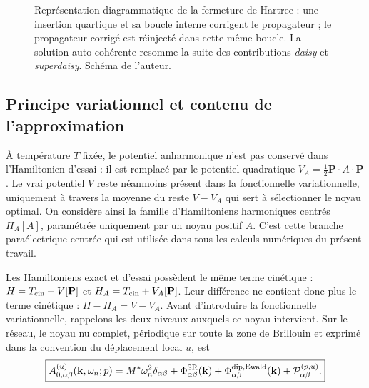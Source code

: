 \begin{figure}[htbp]
\centering
{}
\caption{Représentation diagrammatique de la fermeture de Hartree : une
insertion quartique et sa boucle interne corrigent le propagateur ; le
propagateur corrigé est réinjecté dans cette même boucle. La solution
auto-cohérente resomme la suite des contributions \emph{daisy} et
\emph{superdaisy}. Schéma de l'auteur.}
\label{fig:core_hartree_daisy}
\end{figure}


\subsection{Principe variationnel et contenu de l'approximation}
\label{sec:core_scha_variational_principle}

À température $T$ fixée, le potentiel anharmonique n'est pas conservé dans
l'Hamiltonien d'essai : il est remplacé par le potentiel quadratique
$V_A=\tfrac12\mathbf P\cdot A\cdot\mathbf P$. Le vrai potentiel $V$ reste
néanmoins présent dans la fonctionnelle variationnelle, uniquement à travers
la moyenne du reste $V-V_A$ qui sert à sélectionner le noyau optimal. On
considère ainsi la famille d'Hamiltoniens harmoniques centrés $H_A[A]$,
paramétrée uniquement par un noyau positif $A$. C'est cette branche
paraélectrique centrée qui est utilisée dans tous les calculs numériques du
présent travail.

Les Hamiltoniens exact et d'essai possèdent le même terme cinétique :
$H=T_{\rm cin}+V[\mathbf P]$ et $H_A=T_{\rm cin}+V_A[\mathbf P]$. Leur
différence ne contient donc plus le terme cinétique :
$H-H_A=V-V_A$. Avant d'introduire la fonctionnelle variationnelle, rappelons
les deux niveaux auxquels ce noyau intervient. Sur le réseau, le noyau nu
complet, périodique sur toute la zone de Brillouin et exprimé dans la
convention du déplacement local $u$, est
\begin{equation}
\boxed{
A^{(u)}_{0,\alpha\beta}(\mathbf k,\omega_n;p)
=M^*\omega_n^2\delta_{\alpha\beta}
+\Phi^{\rm SR}_{\alpha\beta}(\mathbf k)
+\Phi^{\rm dip,Ewald}_{\alpha\beta}(\mathbf k)
+\mathcal P^{(p,u)}_{\alpha\beta}.}
\label{eq:core_scha_full_bare_kernel}
\end{equation}

